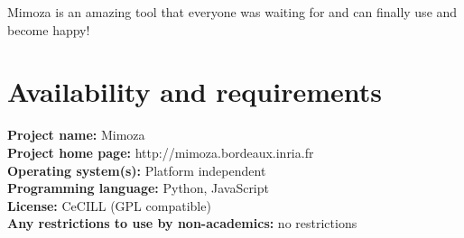 \documentclass{bmcart}
\begin{document}
Mimoza is an amazing tool that everyone was waiting for and can finally use and become happy!

\section*{Availability and requirements}
\textbf{Project name:} Mimoza\\
\textbf{Project home page:} http://mimoza.bordeaux.inria.fr\\
\textbf{Operating system(s):} Platform independent\\
\textbf{Programming language:} Python, JavaScript\\
\textbf{License:} CeCILL (GPL compatible)\\
\textbf{Any restrictions to use by non-academics:} no restrictions

\end{document}

